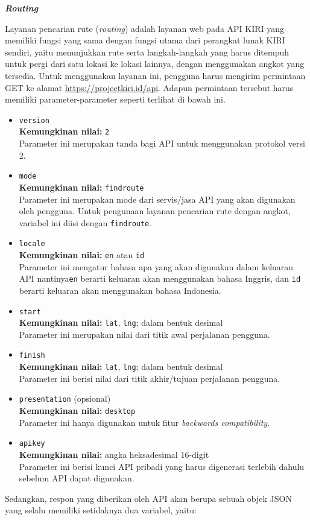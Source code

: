 \documentclass[a4paper,twoside]{article}
\begin{document}
\begin{enumerate}
\large{\textbf{\textit{Routing}}}
\label{sec:kiri-api-routing}

Layanan pencarian rute (\textit{routing}) adalah layanan web pada API KIRI yang memiliki fungsi yang sama dengan fungsi utama dari perangkat lunak KIRI sendiri, yaitu menunjukkan rute serta langkah-langkah yang harus ditempuh untuk pergi dari satu lokasi ke lokasi lainnya, dengan menggunakan angkot yang tersedia. Untuk menggunakan layanan ini, pengguna harus mengirim permintaan GET ke alamat \href{https://projectkiri.id/api}{https://projectkiri.id/api}. Adapun permintaan tersebut harus memiliki parameter-parameter seperti terlihat di bawah ini.
\newpage %
\begin{itemize}
	\item \verb|version|\\
	\textbf{Kemungkinan nilai:} \verb|2|\\
	Parameter ini merupakan tanda bagi API untuk menggunakan protokol versi 2.
	\item \verb|mode|\\
	\textbf{Kemungkinan nilai:} \verb|findroute|\\
	Parameter ini merupakan mode dari servis/jasa API yang akan digunakan oleh pengguna. Untuk pengunaan layanan pencarian rute dengan angkot, variabel ini diisi dengan \verb|findroute|.
	\item \verb|locale|\\
	\textbf{Kemungkinan nilai:} \verb|en| atau \verb|id|\\
	Parameter ini mengatur bahasa apa yang akan digunakan dalam keluaran API nantinya\textemdash\verb|en| berarti keluaran akan menggunakan bahasa Inggris, dan \verb|id| berarti keluaran akan menggunakan bahasa Indonesia.
	\item \verb|start|\\
	\textbf{Kemungkinan nilai:} \verb|lat|, \verb|lng|; dalam bentuk desimal\\
	Parameter ini merupakan nilai \latlon dari titik awal perjalanan pengguna.
	\item \verb|finish|\\
	\textbf{Kemungkinan nilai:} \verb|lat|, \verb|lng|; dalam bentuk desimal\\
	Parameter ini berisi nilai \latlon dari titik akhir/tujuan perjalanan pengguna.
	\item \verb|presentation| (opsional)\\
	\textbf{Kemungkinan nilai:} \verb|desktop|\\
	Parameter ini hanya digunakan untuk fitur \textit{backwards compatibility}.
	\item \verb|apikey|\\
	\textbf{Kemungkinan nilai:} angka heksadesimal 16-digit\\
	Parameter ini berisi kunci API pribadi yang harus digenerasi terlebih dahulu sebelum API dapat digunakan.
\end{itemize}
\vspace{\baselineskip}
Sedangkan, respon yang diberikan oleh API akan berupa sebuah objek JSON yang selalu memiliki setidaknya dua variabel, yaitu:


\end{enumerate}
\end{document}
